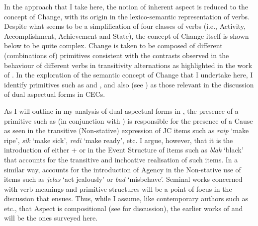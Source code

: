 In the approach that I take here, the notion of inherent aspect is
reduced to the concept of Change, with its origin in the
lexico-semantic representation of verbs.  Despite what seems to be a
simplification of  four classes of verbs (i.e.,
Activity, Accomplishment, Achievement and State), the concept of
Change itself is shown below to be quite complex.  Change is taken to
be composed of different (combinations of) primitives consistent with
the contrasts observed in the behaviour of different verbs in
transitivity alternations as highlighted in the work of
\citet{Levin1993}.  In the exploration of the semantic concept of
Change that I undertake here, I identify primitives such as \CAUSE and
\DO, and also \BECOME (see \citealt{McCawley1968,Carter1976, Dowty1979,})
as those relevant in the discussion of dual aspectual forms in CECs.

As I will outline in my analysis of dual aspectual forms in , 
the presence of a primitive such as \CAUSE (in conjunction with
\BECOME) is responsible for the presence of a Cause as seen in the
transitive (Non-stative) expression of JC items such as \textit{raip}
`make ripe',  \textit{sik} `make sick', \textit{redi} `make ready', etc.
I argue, however, that it is the introduction of either \CAUSE + \BECOME
or \BECOME in the Event Structure of items such as \textit{blak}
`black' that accounts for the transitive and inchoative realisation of
such items.  In a similar way, \DO accounts for the introduction of
Agency in the Non-stative use of items such as \textit{jelas} `act
jealously' or \textit{bad} `misbehave'.  Seminal works concerned with
verb meanings and primitive structures will be a point of focus in the
discussion that ensues.  Thus, while I assume, like contemporary
authors such as \citet{Verkuyl1999,Tenny1994,TennyPustejovsky2000,Rothstein2004,MacDonald2008,} 
etc., that Aspect is compositional (see  for discussion),
the earlier works of \citet{McCawley1968,Carter1976,Dowty1979,Pustejovsky1988,Pustejovsky1991} 
and \citet{Grimshaw1990} will be the ones surveyed here.

